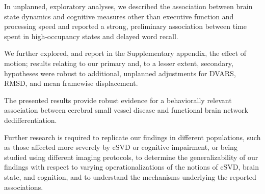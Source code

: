 In unplanned, exploratory analyses, we described the association between brain state dynamics and cognitive measures other than executive function and processing speed and reported a strong, preliminary association between time spent in high-occupancy states and delayed word recall.

We further explored, and report in the Supplementary appendix, the effect of motion; results relating to our primary and, to a lesser extent, secondary, hypotheses were robust to additional, unplanned adjustments for DVARS, RMSD, and mean framewise displacement.

The presented results provide robust evidence for a behaviorally relevant association between cerebral small vessel disease and functional brain network dedifferentiation. 

Further research is required to replicate our findings in different populations, such as those affected more severely by cSVD or cognitive impairment, or being studied using different imaging protocols, to determine the generalizability of our findings with respect to varying operationalizations of the notions of cSVD, brain state, and cognition, and to understand the mechanisms underlying the reported associations.

